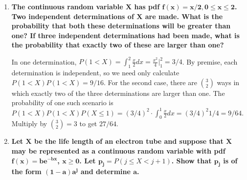 \documentclass[10pt, oneside]{article}
\begin{document}
\begin{enumerate}[label=4.\arabic*]
\begin{enumerate}
\begin{proof}
	\end{proof}
	
	\item  \begin{tcolorbox}[
	  colback=Cerulean!5!white,
	  colframe=Cerulean!75!black]
	\textbf{Show that if $\bm{np - (1 - p) < 0}$, $\bm{p_n(0) > p_n(1) > \cdots > p_n(n)}$ while if $\bm{np - (1-p) = 0, p_n(0) = p_n(1) > p_n(2) > \cdots > p_n(n)}$.}
	\end{tcolorbox}
	
	\begin{proof}
	In the first case, apply (b)(iii) and since $k \geq 0 > np - (1-p)$, for $k = 0$ we have $p_n(0) > p_n(1)$, for $k=1$, $p_n(1) > p_n(2)$, and so-on-and-so-forth until $k = n-1$, $p_n (n-1) > p_n(n)$, establishing the result. In the second case, apply (b)(ii) for $k = np - (1-p) = 0$, therefore $p_n (0) = p_n(1)$, and for $k > np - (1-p) = 0$, apply (b)(iii) to get the desired result.
	\end{proof}

	\end{enumerate}

\item  \begin{tcolorbox}[
  colback=Cerulean!5!white,
  colframe=Cerulean!75!black]
\textbf{The continuous random variable $\bm{X}$ has pdf $\bm{f(x) = x/2, 0 \leq x \leq 2}$. Two independent determinations of $\bm{X}$ are made. What is the probability that both these determinations will be greater than one? If three independent determinations had been made, what is the probability that exactly two of these are larger than one?}
\end{tcolorbox}

In one determination, $P(1 < X) = \int^2_1 \frac{x}{2}dx = \frac{x^2}{4} \Big|^2_1 = 3/4$. By premise, each determination is independent, so we need only calculate $P(1 < X) P(1 < X) = \boxed{9/16}$. For the second case, there are $\binom{3}{2}$ ways in which exactly two of the three determinations are larger than one. The probability of one such scenario is $P(1 < X) P(1 < X) P(X \leq 1) = (3/4)^2 \cdot \int^1_0 \frac{x}{2}dx = (3/4)^2 1/4 = 9/64$. Multiply by $\binom{3}{2} = 3$ to get $\boxed{27/64}$. 

\item  \begin{tcolorbox}[
  colback=Cerulean!5!white,
  colframe=Cerulean!75!black]
\textbf{Let $\bm{X}$ be the life length of an electron tube and suppose that $\bm{X}$ may be represented as a continuous random variable with pdf $\bm{f(x) = be^{-bx}}$, $\bm{x \geq 0}$. Let $\bm{p_j} = P(j \leq X < j + 1)$. Show that $\bm{p_j}$ is of the form $\bm{(1-a)a^j}$ and determine $\bm{a}$.}
\end{tcolorbox}


\end{enumerate}
\end{document}
